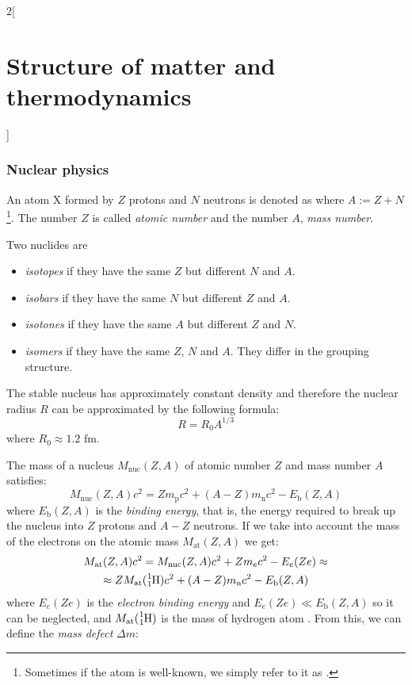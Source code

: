 \documentclass[../../../main.tex]{subfiles}
\begin{document}
\begin{multicols}{2}[\section{Structure of matter and thermodynamics}]
  \subsubsection{Nuclear physics}
  \begin{definition}[Atom]
    An atom X formed by $Z$ protons and $N$ neutrons is denoted as  where $A:=Z+N$\footnote{Sometimes if the atom  is well-known, we simply refer to it as .}. The number $Z$ is called \emph{atomic number} and the number $A$, \emph{mass number}.
  \end{definition}
  \begin{definition}
    Two nuclides are
    \begin{itemize}
      \item \emph{isotopes} if they have the same $Z$ but different $N$ and $A$.
      \item \emph{isobars} if they have the same $N$ but different $Z$ and $A$.
      \item \emph{isotones} if they have the same $A$ but different $Z$ and $N$.
      \item \emph{isomers} if they have the same $Z$, $N$ and $A$. They differ in the grouping structure.
    \end{itemize}
  \end{definition}
  \begin{proposition}
    The stable nucleus has approximately constant density and therefore the nuclear radius $R$ can be approximated by the following formula:
    $$R=R_0A^{1/3}$$ where $R_0\approx1.2\text{ fm}$.
  \end{proposition}
  \begin{proposition}
    The mass of a nucleus $M_\text{nuc}(Z,A)$ of atomic number $Z$ and mass number $A$ satisfies:
    $$M_\text{nuc}(Z,A)c^2=Zm_\text{p}c^2+(A-Z)m_\text{n}c^2-E_\text{b}(Z,A)$$ where $E_\text{b}(Z,A)$ is the \emph{binding energy}, that is, the energy required to break up the nucleus into $Z$ protons and $A-Z$ neutrons. If we take into account the mass of the electrons on the atomic mass $M_\text{at}(Z,A)$ we get:
    \begin{multline*}
      M_\text{at}(Z,A)c^2=M_\text{nuc}(Z,A)c^2+Zm_ec^2-E_e(Ze)\approx\\\approx ZM_\text{at}(\ce{^1_1H})c^2+(A-Z)m_\text{n}c^2-E_\text{b}(Z,A)
    \end{multline*}
    where $E_e(Ze)$ is the \emph{electron binding energy} and $E_e(Ze)\ll E_\text{b}(Z,A)$ so it can be neglected, and $M_\text{at}(\ce{^1_1H})$ is the mass of hydrogen atom . From this, we can define the \emph{mass defect} $\Delta m$:

\end{proposition}
\end{multicols}
\end{document}
